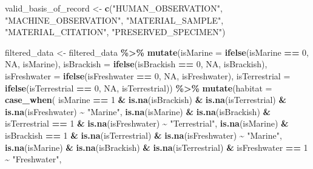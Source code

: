 \documentclass[
]{article}
\newenvironment{Shaded}{\begin{snugshade}}{\end{snugshade}}
\newcommand{\AttributeTok}[1]{\textcolor[rgb]{0.13,0.29,0.53}{#1}}
\newcommand{\ConstantTok}[1]{\textcolor[rgb]{0.56,0.35,0.01}{#1}}
\newcommand{\DecValTok}[1]{\textcolor[rgb]{0.00,0.00,0.81}{#1}}
\newcommand{\FunctionTok}[1]{\textcolor[rgb]{0.13,0.29,0.53}{\textbf{#1}}}
\newcommand{\NormalTok}[1]{#1}
\newcommand{\OtherTok}[1]{\textcolor[rgb]{0.56,0.35,0.01}{#1}}
\newcommand{\SpecialCharTok}[1]{\textcolor[rgb]{0.81,0.36,0.00}{\textbf{#1}}}
\newcommand{\StringTok}[1]{\textcolor[rgb]{0.31,0.60,0.02}{#1}}
\begin{document}
\begin{Shaded}
\begin{Highlighting}[]
\NormalTok{valid\_basis\_of\_record }\OtherTok{\textless{}{-}} \FunctionTok{c}\NormalTok{(}\StringTok{"HUMAN\_OBSERVATION"}\NormalTok{, }\StringTok{"MACHINE\_OBSERVATION"}\NormalTok{, }\StringTok{"MATERIAL\_SAMPLE"}\NormalTok{, }\StringTok{"MATERIAL\_CITATION"}\NormalTok{, }\StringTok{"PRESERVED\_SPECIMEN"}\NormalTok{)}

\NormalTok{filtered\_data }\OtherTok{\textless{}{-}}\NormalTok{ filtered\_data }\SpecialCharTok{\%\textgreater{}\%}
  \FunctionTok{mutate}\NormalTok{(}\AttributeTok{isMarine =} \FunctionTok{ifelse}\NormalTok{(isMarine }\SpecialCharTok{==} \DecValTok{0}\NormalTok{, }\ConstantTok{NA}\NormalTok{, isMarine),}
         \AttributeTok{isBrackish =} \FunctionTok{ifelse}\NormalTok{(isBrackish }\SpecialCharTok{==} \DecValTok{0}\NormalTok{, }\ConstantTok{NA}\NormalTok{, isBrackish),}
         \AttributeTok{isFreshwater =} \FunctionTok{ifelse}\NormalTok{(isFreshwater }\SpecialCharTok{==} \DecValTok{0}\NormalTok{, }\ConstantTok{NA}\NormalTok{, isFreshwater),}
         \AttributeTok{isTerrestrial =} \FunctionTok{ifelse}\NormalTok{(isTerrestrial }\SpecialCharTok{==} \DecValTok{0}\NormalTok{, }\ConstantTok{NA}\NormalTok{, isTerrestrial)) }\SpecialCharTok{\%\textgreater{}\%}
  \FunctionTok{mutate}\NormalTok{(}\AttributeTok{habitat =} \FunctionTok{case\_when}\NormalTok{(}
\NormalTok{    isMarine }\SpecialCharTok{==} \DecValTok{1} \SpecialCharTok{\&} \FunctionTok{is.na}\NormalTok{(isBrackish) }\SpecialCharTok{\&} \FunctionTok{is.na}\NormalTok{(isTerrestrial) }\SpecialCharTok{\&} \FunctionTok{is.na}\NormalTok{(isFreshwater) }\SpecialCharTok{\textasciitilde{}} \StringTok{"Marine"}\NormalTok{,}
    \FunctionTok{is.na}\NormalTok{(isMarine) }\SpecialCharTok{\&} \FunctionTok{is.na}\NormalTok{(isBrackish) }\SpecialCharTok{\&}\NormalTok{ isTerrestrial }\SpecialCharTok{==} \DecValTok{1} \SpecialCharTok{\&} \FunctionTok{is.na}\NormalTok{(isFreshwater) }\SpecialCharTok{\textasciitilde{}} \StringTok{"Terrestrial"}\NormalTok{,}
    \FunctionTok{is.na}\NormalTok{(isMarine) }\SpecialCharTok{\&}\NormalTok{ isBrackish }\SpecialCharTok{==} \DecValTok{1} \SpecialCharTok{\&} \FunctionTok{is.na}\NormalTok{(isTerrestrial) }\SpecialCharTok{\&} \FunctionTok{is.na}\NormalTok{(isFreshwater) }\SpecialCharTok{\textasciitilde{}} \StringTok{"Marine"}\NormalTok{,}
    \FunctionTok{is.na}\NormalTok{(isMarine) }\SpecialCharTok{\&} \FunctionTok{is.na}\NormalTok{(isBrackish) }\SpecialCharTok{\&} \FunctionTok{is.na}\NormalTok{(isTerrestrial) }\SpecialCharTok{\&}\NormalTok{ isFreshwater }\SpecialCharTok{==} \DecValTok{1} \SpecialCharTok{\textasciitilde{}} \StringTok{"Freshwater"}\NormalTok{,}

\end{Highlighting}
\end{Shaded}
\end{document}
